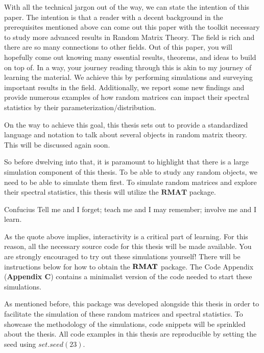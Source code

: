 With all the technical jargon out of the way, we can state the intention of this paper.
The intention is that a reader with a decent background in the prerequisites mentioned above can come out this paper with the toolkit necessary to study more advanced results in Random Matrix Theory.
The field is rich and there are so many connections to other fields. Out of this paper, you will hopefully come out knowing many essential results, theorems, and ideas to build on top of.
In a way, your journey reading through this is akin to my journey of learning the material. We achieve this by performing simulations and surveying important results in the field. Additionally, we report some
new findings and provide numerous examples of how random matrices can impact their spectral statistics by their parameterization/distribution.

On the way to achieve this goal, this thesis sets out to provide a standardized language and notation to talk about several objects in random matrix theory. This will be discussed again soon.

So before dwelving into that, it is paramount to highlight that there is a large simulation component of this thesis. To be able to study any random objects, we need to be able to simulate them first.
To simulate random matrices and explore their spectral statistics, this thesis will utilize the $\textbf{RMAT}$ package.


\begin{aquote}{Confucius}
Tell me and I forget; teach me and I may remember; involve me and I learn.
\end{aquote}

As the quote above implies, interactivity is a critical part of learning.
For this reason, all the necessary source code for this thesis will be made available. You are strongly encouraged to try out these simulations yourself!
There will be instructions below for how to obtain the ${\textbf{RMAT}}$ package. The Code Appendix (\textbf{Appendix C}) contains a minimalist version of the code
needed to start these simulations.

As mentioned before, this package was developed alongside this thesis in order to facilitate the simulation of these random matrices and spectral statistics.
To showcase the methodology of the simulations, code snippets will be sprinkled about the thesis. All code examples in this thesis are reproducible by setting
the seed using $set.seed(23)$.

